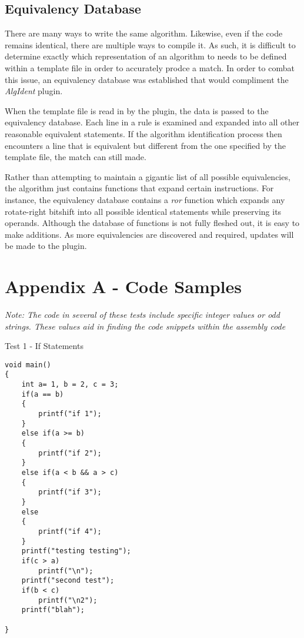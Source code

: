 \documentclass{article}
\begin{document}
\subsection*{Equivalency Database}
There are many ways to write the same algorithm.  Likewise, even if the code remains identical, there are multiple ways to compile it.  As such, it is 
difficult to determine exactly which representation of an algorithm to needs to be defined within a template file in order to accurately prodce a match.  In order to combat this issue, an equivalency database was established
that would compliment the \emph{AlgIdent} plugin.  

When the template file is read in by the plugin, the data is passed to the equivalency database.  Each line in a rule is examined and expanded into all
other reasonable equivalent statements.  If the algorithm identification process then encounters a line that is equivalent but different from the one specified by the template file,
the match can still made.   

Rather than attempting to maintain a gigantic list of all possible equivalencies, the algorithm just contains functions that expand certain instructions.  For instance, the equivalency database
contains a \emph{ror} function which expands any rotate-right bitshift into all possible identical statements while preserving its operands.  Although the database of functions is
not fully fleshed out, it is easy to make additions.  As more equivalencies are discovered and required, updates will be made to the plugin.

  
\pagebreak

\section*{Appendix A - Code Samples}
\emph{Note: The code in several of these tests include specific integer values or odd strings.  These values aid in finding the code snippets within
the assembly code} \\

\begin{algorithm}
\lstset{language=[mips]Assembler}
\caption{Test 1 - If Statements}
\begin{lstlisting}
void main()
{
    int a= 1, b = 2, c = 3;
    if(a == b)
    {
        printf("if 1");
    }
    else if(a >= b)
    {
        printf("if 2");
    }
    else if(a < b && a > c)
    {
        printf("if 3");
    }
    else
    {
        printf("if 4");
    }
    printf("testing testing");
    if(c > a)
        printf("\n");
    printf("second test");
    if(b < c)
        printf("\n2");
    printf("blah");
    
}
\end{lstlisting}
\end{algorithm}
\end{document}
